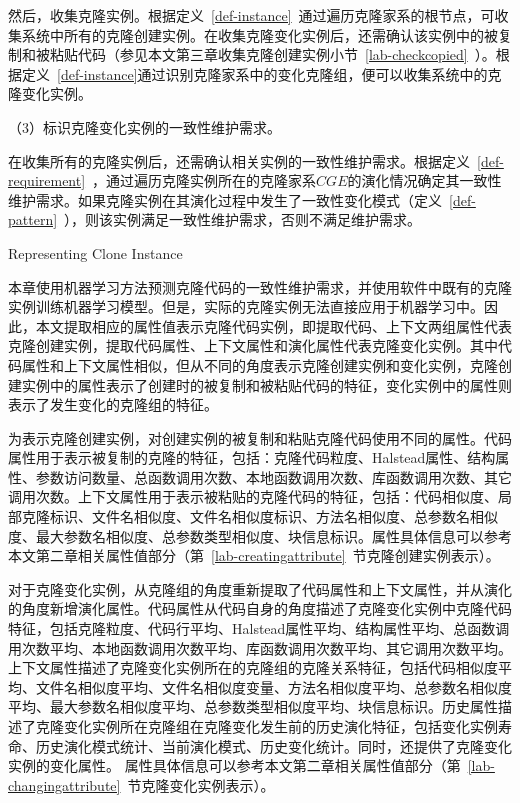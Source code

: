 然后，收集克隆实例。根据定义~\ref{def-instance}~通过遍历克隆家系的根节点，可收集系统中所有的克隆创建实例。在收集克隆变化实例后，还需确认该实例中的被复制和被粘贴代码（参见本文第三章收集克隆创建实例小节~\ref{lab-checkcopied}~）。根据定义~\ref{def-instance}通过识别克隆家系中的变化克隆组，便可以收集系统中的克隆变化实例。

（3）标识克隆变化实例的一致性维护需求。

在收集所有的克隆实例后，还需确认相关实例的一致性维护需求。根据定义~\ref{def-requirement}~，通过遍历克隆实例所在的克隆家系$CGE$的演化情况确定其一致性维护需求。如果克隆实例在其演化过程中发生了一致性变化模式（定义~\ref{def-pattern}~），则该实例满足一致性维护需求，否则不满足维护需求。


{Representing Clone Instance}

本章使用机器学习方法预测克隆代码的一致性维护需求，并使用软件中既有的克隆实例训练机器学习模型。但是，实际的克隆实例无法直接应用于机器学习中。因此，本文提取相应的属性值表示克隆代码实例，即提取代码、上下文两组属性代表克隆创建实例，提取代码属性、上下文属性和演化属性代表克隆变化实例。其中代码属性和上下文属性相似，但从不同的角度表示克隆创建实例和变化实例，克隆创建实例中的属性表示了创建时的被复制和被粘贴代码的特征，变化实例中的属性则表示了发生变化的克隆组的特征。

为表示克隆创建实例，对创建实例的被复制和粘贴克隆代码使用不同的属性。代码属性用于表示被复制的克隆的特征，包括：克隆代码粒度、Halstead属性、结构属性、参数访问数量、总函数调用次数、本地函数调用次数、库函数调用次数、其它调用次数。上下文属性用于表示被粘贴的克隆代码的特征，包括：代码相似度、局部克隆标识、文件名相似度、文件名相似度标识、方法名相似度、总参数名相似度、最大参数名相似度、总参数类型相似度、块信息标识。属性具体信息可以参考本文第二章相关属性值部分（第~\ref{lab-creatingattribute}~节克隆创建实例表示）。

对于克隆变化实例，从克隆组的角度重新提取了代码属性和上下文属性，并从演化的角度新增演化属性。代码属性从代码自身的角度描述了克隆变化实例中克隆代码特征，包括克隆粒度、代码行平均、Halstead属性平均、结构属性平均、总函数调用次数平均、本地函数调用次数平均、库函数调用次数平均、其它调用次数平均。上下文属性描述了克隆变化实例所在的克隆组的克隆关系特征，包括代码相似度平均、文件名相似度平均、文件名相似度变量、方法名相似度平均、总参数名相似度平均、最大参数名相似度平均、总参数类型相似度平均、块信息标识。历史属性描述了克隆变化实例所在克隆组在克隆变化发生前的历史演化特征，包括变化实例寿命、历史演化模式统计、当前演化模式、历史变化统计。同时，还提供了克隆变化实例的变化属性。
属性具体信息可以参考本文第二章相关属性值部分（第~\ref{lab-changingattribute}~节克隆变化实例表示）。

